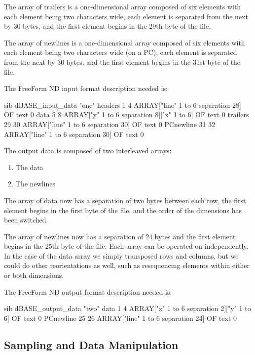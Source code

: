 The array of trailers is a one-dimensional array composed of six
elements with each element being two characters wide, each element is
separated from the next by 30 bytes, and the first element begins in
the 29th byte of the file.

The array of newlines is a one-dimensional array composed of six
elements with each element being two characters wide (on a PC), each
element is separated from the next by 30 bytes, and the first element
begins in the 31st byte of the file.

The FreeForm ND input format description needed is: 

\begin{vcode}{sib}
dBASE_input_data "one"
headers 1 4 ARRAY["line" 1 to 6 separation 28] OF text 0
data 5 8 ARRAY["y" 1 to 6 separation 8]["x" 1 to 6] OF text 0
trailers 29 30 ARRAY["line" 1 to 6 separation 30] OF text 0
PCnewline 31 32 ARRAY["line" 1 to 6 separation 30] OF text 0
\end{vcode}

The output data is composed of two interleaved arrays: 

\begin{enumerate}

\item The data  

\item The newlines  
\end{enumerate}

The array of data now has a separation of two bytes between each row,
the first element begins in the first byte of the file, and the order
of the dimensions has been switched.

The array of newlines now has a separation of 24 bytes and the first
element begins in the 25th byte of the file. Each array can be
operated on independently.  In the case of the data array we simply
transposed rows and columns, but we could do other reorientations as
well, such as resequencing elements within either or both dimensions.

The FreeForm ND output format description needed is: 

\begin{vcode}{sib}
dBASE_output_data "two"
data 1 4 ARRAY["x" 1 to 6 separation 2]["y" 1 to 6] OF text 0
PCnewline 25 26 ARRAY["line" 1 to 6 separation 24] OF text 0
\end{vcode}

\subsection{Sampling and Data Manipulation}

